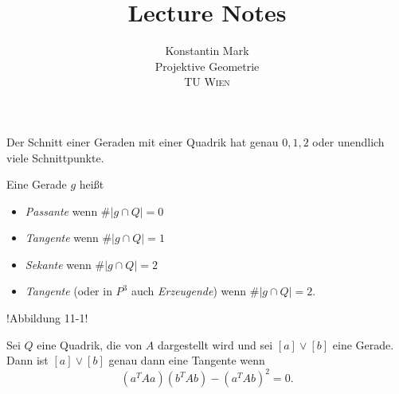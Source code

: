 \documentclass[11pt]{article}
\title{Lecture Notes}
\author{Konstantin Mark\\
Projektive Geometrie\\ 
\textsc{TU Wien}
}
\begin{document}
\maketitle

\begin{theorem}
Der Schnitt einer Geraden mit einer Quadrik hat genau $0,1,2$ oder unendlich viele Schnittpunkte.  
\end{theorem}
\begin{definition}
Eine Gerade $g$ heißt\begin{itemize}
    \item \textit{Passante} wenn $\#|g\cap Q|= 0$
    \item \textit{Tangente} wenn $\#|g\cap Q| = 1$
    \item \textit{Sekante} wenn $\#|g\cap Q|=2$
    \item \textit{Tangente }(oder in $P^3$ auch \textit{Erzeugende}) wenn $\#|g\cap Q| = 2$.
\end{itemize}
!Abbildung 11-1!
\end{definition}
\begin{theorem}\label{thm:tang}
Sei $Q$ eine Quadrik, die von $A$ dargestellt wird und sei $[a]\lor [b]$ eine Gerade. Dann ist $[a]\lor [b]$ genau dann eine Tangente wenn \begin{equation}\label{eq:tang}
    (a^TAa)(b^TAb) - (a^TAb)^2 = 0.
\end{equation}
\end{theorem}
\end{document}
